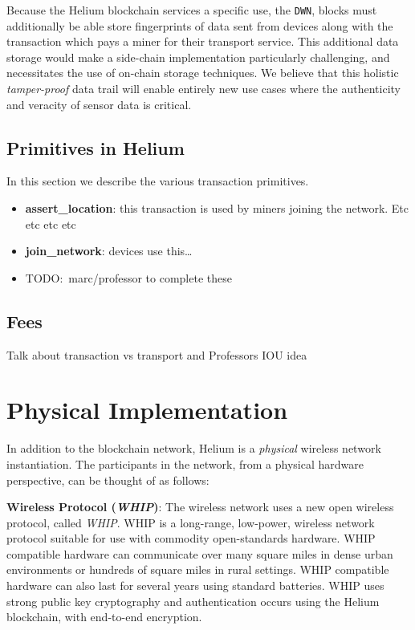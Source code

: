 \documentclass[letterpaper,11pt]{article}
\newcommand{\todo}[1]{}
\renewcommand{\todo}[1]{{\color{red} TODO:\ {#1}}}
\begin{document}
Because the Helium blockchain services a specific use, the \verb|DWN|, blocks must additionally be able store fingerprints of data sent from devices along with the transaction which pays a miner for their transport service. This additional data storage would make a side-chain implementation particularly challenging, and necessitates the use of on-chain storage techniques. We believe that this holistic \emph{tamper-proof} data trail will enable entirely new use cases where the authenticity and veracity of sensor data is critical.

\subsection{Primitives in Helium}

In this section we describe the various transaction primitives.

\begin{itemize}
  \item \textbf{assert\_location}: this transaction is used by miners joining the network. Etc etc etc etc
  \item \textbf{join\_network}: devices use this\ldots
  \item \todo{marc/professor to complete these}
\end{itemize}

\subsection{Fees}

Talk about transaction vs transport and Professors IOU idea

\newpage

\section{Physical Implementation}

In addition to the blockchain network, Helium is a \emph{physical} wireless network instantiation. The participants in the network, from a physical hardware perspective, can be thought of as follows:

\textbf{Wireless Protocol (\emph{WHIP})}: The wireless network uses a new open wireless protocol, called \emph{WHIP}. WHIP is a long-range, low-power, wireless network protocol suitable for use with commodity open-standards hardware. WHIP compatible hardware can communicate over many square miles in dense urban environments or hundreds of square miles in rural settings. WHIP compatible hardware can also last for several years using standard batteries. WHIP uses strong public key cryptography and authentication occurs using the Helium blockchain, with end-to-end encryption.
\end{document}
